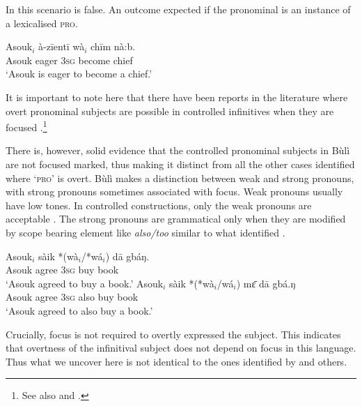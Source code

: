\documentclass[output=paper,colorlinks,citecolor=brown]{langscibook}
\begin{document}
In this scenario  is false. An outcome expected if the pronominal is an instance of a lexicalised \textsc{pro}. 

\ea%
    \label{ex:sulemana:23}
    \gll    Asouk$_i$ à-zīentī wà$_i$ chīm nà:b.  \\
            Asouk eager \textsc{3sg} become chief \\
    \glt    `Asouk is eager to become a chief.'
\z

It is important to note here that there have been reports in the literature where overt pronominal subjects are possible in controlled infinitives when they are focused \citep{Szabolcsi2009}.\footnote{See also \citet{Barbosa2009} and  \citet{Madigan2008}.}


There is, however, solid evidence that the controlled pronominal subjects in Bùlì are not focused marked, thus making it distinct from all the other cases identified where `\textsc{pro}' is overt. Bùlì makes a distinction between weak and strong pronouns, with strong pronouns sometimes associated with focus. Weak pronouns usually have low tones. In controlled constructions, only the weak pronouns are acceptable . The strong pronouns are grammatical only when they are modified by scope bearing element like {\it{also/too}} similar to what \citet{Szabolcsi2009}  identified .

\ea%
    \label{ex:sulemana:24}
    \ea%
    \label{ex:sulemana:24a} 
    \gll    Asouk$_i$ sàik *(wà$_i$/*wá$_i$) dā gbáŋ. \\
            Asouk agree \textsc{3sg}  buy book\\
    \glt    `Asouk agreed to buy a book.'
    \ex%
    \label{ex:sulemana:24b} 
    \gll    Asouk$_i$ sàik *(*wà$_i$/wá$_i$) mɛ̄ dā gbá.ŋ \\
            Asouk agree \textsc{3sg} also  buy book\\
    \glt    `Asouk agreed to also buy a book.'
    \z
\z

Crucially, focus is not required to overtly expressed the subject. This indicates that overtness of the infinitival subject does not depend on focus in this language. Thus what we uncover here is not identical to the ones identified by \citet{Szabolcsi2009} and others. 
\end{document}
